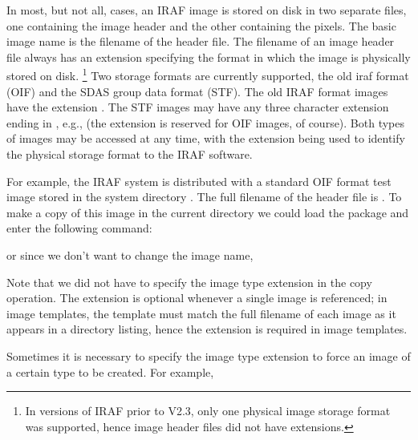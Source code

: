 In most, but not all, cases, an IRAF image is stored on disk in two separate
files, one containing the image header and the other containing the pixels.
The basic image name is the filename of the header file.  The filename of an
image header file always has an extension specifying the format in which the
image is physically stored on disk. \footnote{In versions of IRAF prior to
V2.3, only one physical image storage format was supported, hence image header
files did not have extensions.}  Two storage formats are currently supported,
the old iraf format (OIF) and the SDAS group data format (STF).  The old IRAF
format images have the extension .  The STF images may have any
three character extension ending in , e.g., 
(the extension  is reserved for OIF images, of course).
Both types of images may be accessed at any time, with the extension being
used to identify the physical storage format to the IRAF software.

For example, the IRAF system is distributed with a standard OIF format test
image  stored in the system directory .  The full
filename of the header file is .  To make a copy of
this image in the current directory we could load the 
package and enter the following command:

\begin{quotation}\noindent
{} 
\end{quotation}

\noindent
or since we don't want to change the image name,

\begin{quotation}\noindent
{} 
\end{quotation}

\noindent
Note that we did not have to specify the image type extension in the copy
operation.  The extension is optional whenever a single image is referenced;
in image templates, the template must match the full filename of each image
as it appears in a directory listing, hence the extension is required in
image templates.

Sometimes it is necessary to specify the image type extension to force an
image of a certain type to be created.  For example,

\begin{quotation}\noindent
{} 
\end{quotation}

